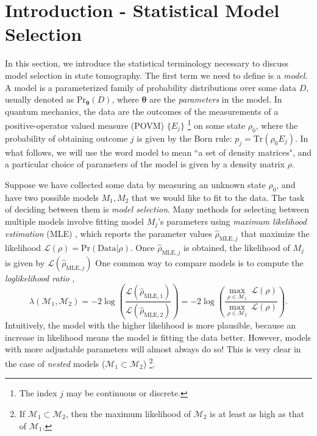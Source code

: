 \documentclass[aps,pra, twocolumn]{revtex4-1}
\newcommand{\bs}[1]{\boldsymbol{#1}}
\newcommand{\M}{\mathcal{M}}
\newcommand{\cL}{\mathcal{L}}
\begin{document}
\section{Introduction - Statistical Model Selection}

In this section, we introduce the statistical terminology necessary to discuss model selection in state tomography. The first term we need to define is a \emph{model}. A model is a parameterized family of probability distributions over some data $D$, usually denoted as $\mathrm{Pr}_{\bs{\theta}}(D)$, where $\bs{\theta}$ are the \emph{parameters} in the model. In quantum mechanics, the data are the outcomes of the measurements of a positive-operator valued measure (POVM) $\{E_{j}\}$ \footnote{The index $j$ may be continuous or discrete.} on some state $\rho_{0}$, where the probability of obtaining outcome $j$ is given by the Born rule: $p_{j} = \mathrm{Tr}(\rho_{0} E_{j})$. In what follows, we will use the word model to mean ``a set of density matrices", and a particular choice of parameters of the model is given by a density matrix $\rho$.

Suppose we have collected some data by measuring an unknown state $\rho_{0}$, and have two possible models $M_{1}, M_{2}$ that we would like to fit to the data. The task of deciding between them is \emph{model selection}. Many methods for selecting between multiple models involve fitting model $M_{j}$'s parameters using \emph{maximum likelihood estimation} (MLE) \cite{Hradil1997, JamesPRA2001, Blume-Kohout2010}, which reports the parameter values $\hat{\rho}_{\mathrm{MLE}, j}$ that maximize the likelihood $\mathcal{L}(\rho) = \mathrm{Pr}(\mathrm{Data}|\rho)$. Once $\hat{\rho}_{\mathrm{MLE}, j}$ is obtained, the likelihood of $M_{j}$ is given by $\mathcal{L}(\hat{\rho}_{\mathrm{MLE}, j})$ One common way to compare models is to compute the \emph{loglikelihood ratio} \cite{Blume-Kohout2010, Moroder2013, Neyman1933},
\begin{equation}
\lambda(\M_{1}, \M_{2}) = -2 \log \left(\frac{\cL(\hat{\rho}_{\mathrm{MLE},1})}{\cL(\hat{\rho}_{\mathrm{MLE},2})}\right) = -2 \log \left(\frac{\underset{\rho \in \M_{1}}{\max}~\cL(\rho)}{\underset{\rho \in 
\M_{2}}{\max}~\cL(\rho)}\right).
\end{equation}
Intuitively, the model with the higher likelihood is more plausible, because an increase in likelihood means the model is fitting the data better. However, models with 
more adjustable parameters will almost always do so!  This is very clear in the case
of \emph{nested} models ($\M_{1} \subset \M_{2}$) \footnote{If $\M_{1}\subset \M_{2}$, then the maximum likelihood of $\M_{2}$ is at least as high as that of $\M_{1}$.}.
\end{document}
